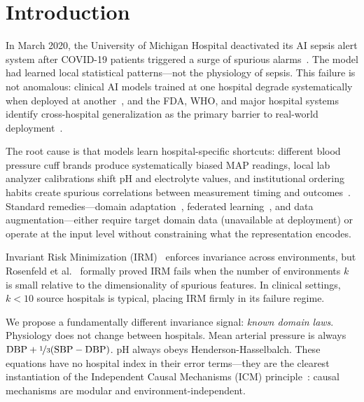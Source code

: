 \documentclass{article}
\begin{document}
\section{Introduction}
\label{sec:intro}

In March 2020, the University of Michigan Hospital deactivated its AI sepsis alert system after COVID-19 patients triggered a surge of spurious alarms~\citep{wong2021external}.
The model had learned local statistical patterns---not the physiology of sepsis.
This failure is not anomalous: clinical AI models trained at one hospital degrade systematically when deployed at another~\citep{zech2018variable, futoma2020myth, nestor2019feature}, and the FDA, WHO, and major hospital systems identify cross-hospital generalization as the primary barrier to real-world deployment~\citep{fda2021action}.

The root cause is that models learn hospital-specific shortcuts: different blood pressure cuff brands produce systematically biased MAP readings, local lab analyzer calibrations shift pH and electrolyte values, and institutional ordering habits create spurious correlations between measurement timing and outcomes~\citep{finlayson2021clinician}.
Standard remedies---domain adaptation~\citep{ganin2016domain}, federated learning~\citep{rieke2020future}, and data augmentation---either require target domain data (unavailable at deployment) or operate at the input level without constraining what the representation encodes.

Invariant Risk Minimization (IRM)~\citep{arjovsky2019invariant} enforces invariance across environments, but Rosenfeld et al.~\citep{rosenfeld2021risks} formally proved IRM fails when the number of environments $k$ is small relative to the dimensionality of spurious features.
In clinical settings, $k < 10$ source hospitals is typical, placing IRM firmly in its failure regime.

We propose a fundamentally different invariance signal: \emph{known domain laws}.
Physiology does not change between hospitals.
Mean arterial pressure is always $\text{DBP} + \nicefrac{1}{3}(\text{SBP} - \text{DBP})$.
pH always obeys Henderson-Hasselbalch.
These equations have no hospital index in their error terms---they are the clearest instantiation of the Independent Causal Mechanisms (ICM) principle~\citep{scholkopf2021toward}: causal mechanisms are modular and environment-independent.
\end{document}
